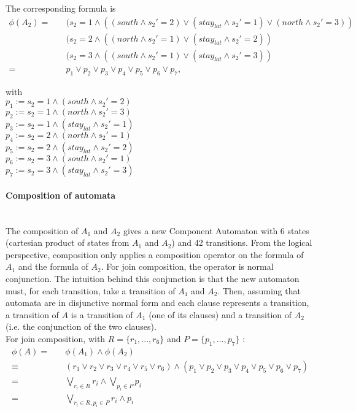 \documentclass{article}
\begin{document}
\noindent
The corresponding formula is
\begin{align*}
\phi(A_2) =  & \quad ( s_2=1 \land ((south \land s_2'=2) \lor (stay_{lat}\land s_2'=1) \lor (north \land s_2'=3))  \\
	&\quad( s_2=2 \land ((north \land s_2'=1) \lor (stay_{lat}\land s_2'=2)) \\
	&\quad( s_2=3 \land ((south \land s_2'=1) \lor (stay_{lat}\land s_2'=3)) \\
	=  &\quad p_1 \lor p_2 \lor p_3 \lor p_4 \lor p_5 \lor p_6 \lor p_7 ,
\end{align*}

\noindent
with\\
$p_1 := s_2=1 \land (south \land s_2'=2)$\\ \quad
$p_2 := s_2=1 \land (north \land s_2'=3)$\\ \quad
$p_3 := s_2=1 \land (stay_{lat}\land s_2'=1)$\\ \quad
$p_4 := s_2=2 \land (north \land s_2'=1) $\\ \quad
$p_5 := s_2=2 \land (stay_{lat}\land s_2'=2)$\\ \quad
$p_6 := s_2=3 \land (south \land s_2'=1) $\\ \quad
$p_7 := s_2=3 \land (stay_{lat}\land s_2'=3) $\\ \quad


\paragraph{Composition of automata} \hspace{0pt} \\

The composition of $A_1$ and $A_2$ gives a new Component Automaton with 6 states (cartesian product of states from $A_1$ and $A_2$) and 42 transitions. From the logical perspective, composition only applies a composition operator on the formula of $A_1$ and the formula of $A_2$. 
For join composition, the operator is normal conjunction. The intuition behind this conjunction is that the new automaton must, for each transition, take a transition of $A_1$ and $A_2$. Then, assuming that automata are in disjunctive normal form and each clause represents a transition, a transition of $A$ is a transition of $A_1$ (one of its clauses) and a transition of $A_2$ (i.e. the conjunction of the two clauses). \\

For join composition, with $R = \{r_1, ..., r_6\}$ and $P=\{p_1, ...,p_7\}$  :
\begin{align*}
\phi(A)= &\quad \phi(A_1) \land \phi(A_2)\\
	\equiv & \quad (r_1 \lor r_2 \lor r_3 \lor r_4 \lor r_5 \lor r_6 ) \land (p_1 \lor p_2 \lor p_3 \lor p_4 \lor p_5 \lor p_6 \lor p_7)\\
	= & \quad \bigvee_{r_{i} \in R}r_i \land \bigvee_{p_i \in P} p_i\\
	= & \quad \bigvee_{r_{i} \in R, p_i \in P}r_i \land p_i
\end{align*}
\end{document}
